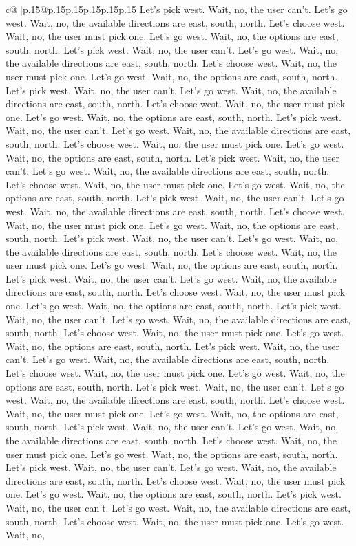 \documentclass{article}
\begin{document}
{\begin{supertabular}{c@{$\;$}|p{.15\linewidth}@{}p{.15\linewidth}p{.15\linewidth}p{.15\linewidth}p{.15\linewidth}p{.15\linewidth}}
{{{Let's pick west. Wait, no, the user can't. Let's go west. Wait, no, the available directions are east, south, north. Let's choose west. Wait, no, the user must pick one. Let's go west. Wait, no, the options are east, south, north. Let's pick west. Wait, no, the user can't. Let's go west. Wait, no, the available directions are east, south, north. Let's choose west. Wait, no, the user must pick one. Let's go west. Wait, no, the options are east, south, north. Let's pick west. Wait, no, the user can't. Let's go west. Wait, no, the available directions are east, south, north. Let's choose west. Wait, no, the user must pick one. Let's go west. Wait, no, the options are east, south, north. Let's pick west. Wait, no, the user can't. Let's go west. Wait, no, the available directions are east, south, north. Let's choose west. Wait, no, the user must pick one. Let's go west. Wait, no, the options are east, south, north. Let's pick west. Wait, no, the user can't. Let's go west. Wait, no, the available directions are east, south, north. Let's choose west. Wait, no, the user must pick one. Let's go west. Wait, no, the options are east, south, north. Let's pick west. Wait, no, the user can't. Let's go west. Wait, no, the available directions are east, south, north. Let's choose west. Wait, no, the user must pick one. Let's go west. Wait, no, the options are east, south, north. Let's pick west. Wait, no, the user can't. Let's go west. Wait, no, the available directions are east, south, north. Let's choose west. Wait, no, the user must pick one. Let's go west. Wait, no, the options are east, south, north. Let's pick west. Wait, no, the user can't. Let's go west. Wait, no, the available directions are east, south, north. Let's choose west. Wait, no, the user must pick one. Let's go west. Wait, no, the options are east, south, north. Let's pick west. Wait, no, the user can't. Let's go west. Wait, no, the available directions are east, south, north. Let's choose west. Wait, no, the user must pick one. Let's go west. Wait, no, the options are east, south, north. Let's pick west. Wait, no, the user can't. Let's go west. Wait, no, the available directions are east, south, north. Let's choose west. Wait, no, the user must pick one. Let's go west. Wait, no, the options are east, south, north. Let's pick west. Wait, no, the user can't. Let's go west. Wait, no, the available directions are east, south, north. Let's choose west. Wait, no, the user must pick one. Let's go west. Wait, no, the options are east, south, north. Let's pick west. Wait, no, the user can't. Let's go west. Wait, no, the available directions are east, south, north. Let's choose west. Wait, no, the user must pick one. Let's go west. Wait, no, the options are east, south, north. Let's pick west. Wait, no, the user can't. Let's go west. Wait, no, the available directions are east, south, north. Let's choose west. Wait, no, the user must pick one. Let's go west. Wait, no, the options are east, south, north. Let's pick west. Wait, no, the user can't. Let's go west. Wait, no, the available directions are east, south, north. Let's choose west. Wait, no, the user must pick one. Let's go west. Wait, no, }}}
\end{supertabular}}
\end{document}
